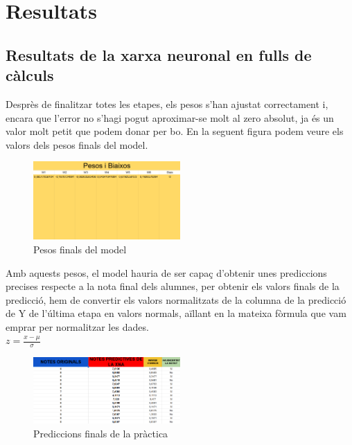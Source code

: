 \chapter{Resultats}
\label{c:Resultats}
\section{Resultats de la xarxa neuronal en fulls de càlculs}
Desprès de finalitzar totes les etapes, els pesos s'han ajustat correctament i, encara que l'error no s'hagi pogut aproximar-se molt al zero absolut, ja és un valor molt petit que podem donar per bo. En la seguent figura podem veure els valors dels pesos finals del model.\\

\begin{figure}[H]
    \centering
    \includegraphics[width=0.5\textwidth]{./figures/Pesos_finals.png}
    \caption{Pesos finals del model}
\end{figure}

Amb aquests pesos, el model hauria de ser capaç d'obtenir unes prediccions precises respecte a la nota final dels alumnes, per obtenir els valors finals de la predicció, hem de convertir els valors normalitzats de la columna de la predicció de Y de l'última etapa en valors normals, aïllant en la mateixa fòrmula que vam emprar per normalitzar les dades.\\
$z = \frac{x - \mu}{\sigma}$\\

\begin{figure}[H]
    \centering
    \includegraphics[width=0.5\textwidth]{./figures/Resultat_final.png}
    \caption{Prediccions finals de la pràctica}
\end{figure}

